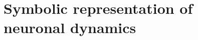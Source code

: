 \documentclass{ws-book9x6}
\begin{document}








\setcounter{page}{1}


%


%

%

%

\chapter[Symbolic representation of neuronal dynamics]{Symbolic representation of neuronal dynamics}\label{ch1}
\end{document}
